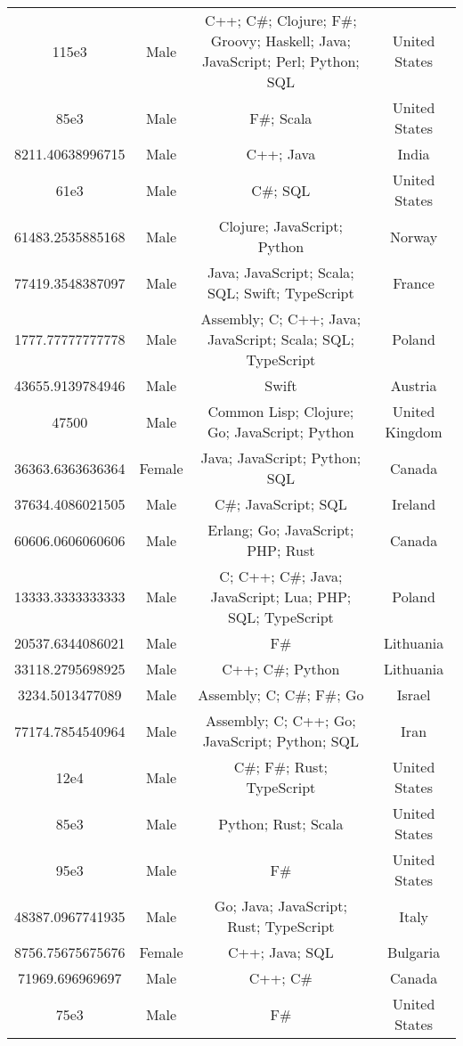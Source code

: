 \begin{center}
\begin{tabular}{ |c|c|c|c| }
115e3  &  Male  &  C++; C\#; Clojure; F\#; Groovy; Haskell; Java; JavaScript; Perl; Python; SQL  &  United States  \\ 
85e3  &  Male  &  F\#; Scala  &  United States  \\ 
8211.40638996715  &  Male  &  C++; Java  &  India  \\ 
61e3  &  Male  &  C\#; SQL  &  United States  \\ 
61483.2535885168  &  Male  &  Clojure; JavaScript; Python  &  Norway  \\ 
77419.3548387097  &  Male  &  Java; JavaScript; Scala; SQL; Swift; TypeScript  &  France  \\ 
1777.77777777778  &  Male  &  Assembly; C; C++; Java; JavaScript; Scala; SQL; TypeScript  &  Poland  \\ 
43655.9139784946  &  Male  &  Swift  &  Austria  \\ 
47500  &  Male  &  Common Lisp; Clojure; Go; JavaScript; Python  &  United Kingdom  \\ 
36363.6363636364  &  Female  &  Java; JavaScript; Python; SQL  &  Canada  \\ 
37634.4086021505  &  Male  &  C\#; JavaScript; SQL  &  Ireland  \\ 
60606.0606060606  &  Male  &  Erlang; Go; JavaScript; PHP; Rust  &  Canada  \\ 
13333.3333333333  &  Male  &  C; C++; C\#; Java; JavaScript; Lua; PHP; SQL; TypeScript  &  Poland  \\ 
20537.6344086021  &  Male  &  F\#  &  Lithuania  \\ 
33118.2795698925  &  Male  &  C++; C\#; Python  &  Lithuania  \\ 
3234.5013477089  &  Male  &  Assembly; C; C\#; F\#; Go  &  Israel  \\ 
77174.7854540964  &  Male  &  Assembly; C; C++; Go; JavaScript; Python; SQL  &  Iran  \\ 
12e4  &  Male  &  C\#; F\#; Rust; TypeScript  &  United States  \\ 
85e3  &  Male  &  Python; Rust; Scala  &  United States  \\ 
95e3  &  Male  &  F\#  &  United States  \\ 
48387.0967741935  &  Male  &  Go; Java; JavaScript; Rust; TypeScript  &  Italy  \\ 
8756.75675675676  &  Female  &  C++; Java; SQL  &  Bulgaria  \\ 
71969.696969697  &  Male  &  C++; C\#  &  Canada  \\ 
75e3  &  Male  &  F\#  &  United States  \\ 

\end{tabular}
\end{center}
